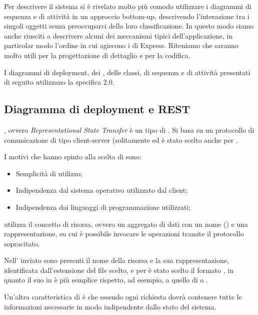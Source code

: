 Per descrivere il sistema si è rivelato molto più comodo utilizzare i diagrammi di sequenza e di attività in un approccio bottom-up, descrivendo l'interazione tra i singoli oggetti senza preoccuparci della loro classificazione. In questo modo siamo anche riusciti a descrivere alcuni dei meccanismi tipici dell'applicazione, in particolar modo l'ordine in cui agiscono i  di Express. Riteniamo che saranno molto utili per la progettazione di dettaglio e per la codifica.

I diagrammi di deployment, dei , delle classi, di sequenza e di attività presentati di seguito utilizzano la specifica  2.0.

\subsection{Diagramma di deployment e REST}
, ovvero \textit{Representational State Transfer} è un tipo di . Si basa su un protocollo di comunicazione  di tipo client-server (solitamente  ed è stato scelto anche per \ProjectName{}.

I motivi che hanno spinto alla scelta di  sono:
\begin{itemize}
\item Semplicità di utilizzo;
\item Indipendenza dal sistema operativo utilizzato dal client;
\item Indipendenza dai linguaggi di programmazione utilizzati;
\end{itemize}

 utilizza il concetto di risorsa, ovvero un aggregato di dati con un nome () e una rappresentazione, su cui è possibile invocare le operazioni  tramite il protocollo sopracitato.

Nell' inviato sono presenti il nome della risorsa e la sua rappresentazione, identificata dall'estensione del file scelto, e per \ProjectName{} è stato scelto il formato , in quanto il suo  in  è più semplice rispetto, ad esempio, a quello di  o .

Un'altra caratteristica di  è che essendo  ogni richiesta dovrà contenere tutte le informazioni necessarie in modo indipendente dallo stato del sistema.

